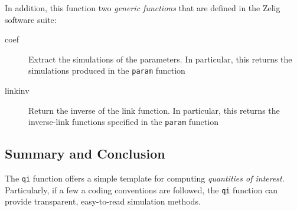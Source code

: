 \documentclass{article}
\newcommand{\code}[1]{{\tt #1}}
\begin{document}
\noindent In addition, this function two \emph{generic functions} that are
defined in the Zelig software suite:

\begin{description}

	\item[coef] Extract the simulations of the parameters. In particular, this
		returns the simulations produced in the \code{param} function
	
	\item[linkinv] Return the inverse of the link function. In particular, this
		returns the inverse-link functions specified in the \code{param} function

\end{description}

\subsection{Summary and Conclusion}

The \code{qi} function offers a simple template for computing \emph{quantities of
interest}. Particularly, if a few a coding conventions are followed, the \code{qi}
function can provide transparent, easy-to-read simulation methods.
\end{document}
